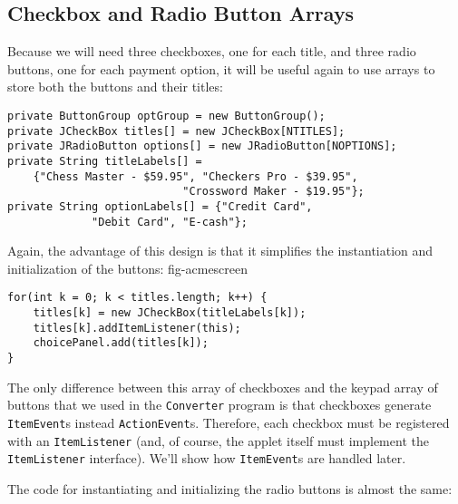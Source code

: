 \subsection{Checkbox and Radio Button Arrays}
\noindent Because we will need three checkboxes, one for each title, and three
radio buttons, one for each payment option, it will be useful again to
use arrays to store both the buttons and their titles:

\begin{jjjlisting}[26.5pc]
\begin{lstlisting}
private ButtonGroup optGroup = new ButtonGroup();
private JCheckBox titles[] = new JCheckBox[NTITLES];
private JRadioButton options[] = new JRadioButton[NOPTIONS];
private String titleLabels[] =
    {"Chess Master - $59.95", "Checkers Pro - $39.95",
                           "Crossword Maker - $19.95"};
private String optionLabels[] = {"Credit Card", 
             "Debit Card", "E-cash"};
\end{lstlisting}
\end{jjjlisting}

\noindent Again, the advantage of this design is that it simplifies the
instantiation and initialization of the buttons:
 {fig-acmescreen}

\begin{jjjlisting}
\begin{lstlisting}
for(int k = 0; k < titles.length; k++) {
    titles[k] = new JCheckBox(titleLabels[k]);
    titles[k].addItemListener(this);
    choicePanel.add(titles[k]);
}
\end{lstlisting}
\end{jjjlisting}

\noindent The only difference between this array of checkboxes and the keypad
array of buttons that we used in the {\tt Converter} program is that
checkboxes generate {\tt ItemEvent}s instead
{\tt ActionEvent}s. Therefore, each checkbox must be registered with an
{\tt ItemListener} (and, of course, the applet itself must implement the
{\tt ItemListener} interface).  We'll show how {\tt ItemEvent}s are
handled later.

The code for instantiating and initializing the radio buttons is
almost the same:

